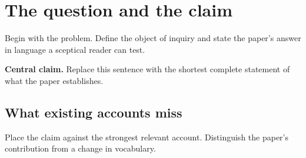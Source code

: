 \section{The question and the claim}\label{sec:argument}

Begin with the problem. Define the object of inquiry and state the paper's
answer in language a sceptical reader can test.

\begin{keyresult}
\textbf{Central claim.} Replace this sentence with the shortest complete
statement of what the paper establishes.
\end{keyresult}

\subsection{What existing accounts miss}

Place the claim against the strongest relevant account. Distinguish the paper's
contribution from a change in vocabulary.
